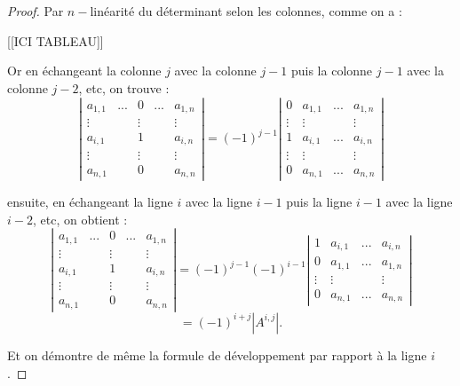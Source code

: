 \documentclass[class=report,crop=false]{standalone}
\begin{document}
\begin{proof}
Par $n-$linéarité du déterminant selon les colonnes, comme on a :


[[ICI TABLEAU]]


Or en échangeant la colonne $j$ avec  la colonne $j-1$ puis la colonne $j-1$ avec la colonne $j-2$, etc, on trouve :
\[\left|\begin{array}{ccccc}
a_{1,1} & ... & 0 & ... & a_{1,n}\\
\vdots & & \vdots & &\vdots\\
a_{i,1} & & 1 && a_{i,n}\\
\vdots && \vdots && \vdots\\
a_{n,1}&& 0 && a_{n,n}
\end{array}\right| = (-1)^{j-1} \left|\begin{array}{cccc}
0 &a_{1,1} & ...  & a_{1,n}\\
\vdots & \vdots&&\vdots\\
1& a_{i,1}& ...&a_{i,n}\\
\vdots &\vdots && \vdots\\
0 & a_{n,1}&...& a_{n,n}
\end{array}\right|\]

ensuite,  en échangeant la ligne $i$ avec la ligne $i-1$ puis la ligne $i-1$ avec la ligne $i-2$, etc, on obtient :
\[\left|\begin{array}{ccccc}
a_{1,1} & ... & 0 & ... & a_{1,n}\\
\vdots & & \vdots & &\vdots\\
a_{i,1} & & 1 && a_{i,n}\\
\vdots && \vdots && \vdots\\
a_{n,1}&& 0 && a_{n,n}
\end{array}\right| = (-1)^{j-1}(-1)^{i-1} \left|\begin{array}{cccc}
1 &a_{i,1} & ...  & a_{i,n}\\
0&a_{1,1} &...&a_{1,n}\\
\vdots& \vdots&&\vdots\\
0 & a_{n,1}&...& a_{n,n}
\end{array}\right|\]
\[= (-1)^{i+j}|A^{i,j}| .\]

Et on démontre de même la formule de développement par rapport à la ligne $i$.
\end{proof}
\end{document}

